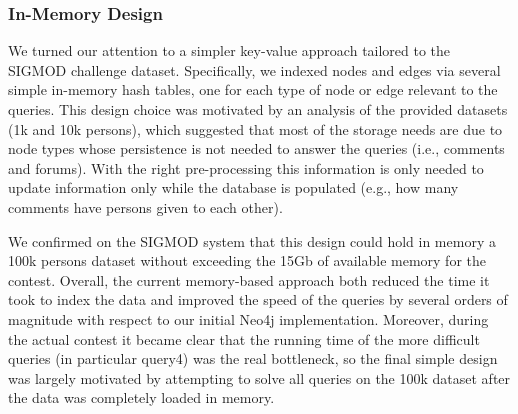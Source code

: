 \documentclass{article}
\begin{document}
\subsubsection{In-Memory Design}
We turned our attention to a simpler key-value approach tailored 
to the SIGMOD challenge dataset. 
Specifically, we indexed nodes and edges via several simple 
in-memory hash tables, one for each type of node or edge 
relevant to the queries. 
This design choice was motivated by an analysis of the provided 
datasets (1k and 10k persons), which suggested that most of the
storage needs are due to node types whose persistence is not needed to 
answer the queries (i.e., comments and forums). With the right 
pre-processing this information is only needed to update information 
only while the database is populated
(e.g., how many comments have persons given to each other).

We confirmed on the SIGMOD system that this design could hold in memory a 
100k persons dataset without exceeding the 15Gb of available memory for 
the contest. Overall, the current memory-based approach both reduced the time it took 
to index the data and improved the speed of the queries by several orders 
of magnitude with respect to our initial Neo4j implementation. Moreover,
during the actual contest it became clear that the running time of the more 
difficult queries (in particular query4) was the real bottleneck, so the final
simple design was largely motivated by attempting to solve all queries on the 100k 
dataset after the data was completely loaded in memory. 

\end{document}
